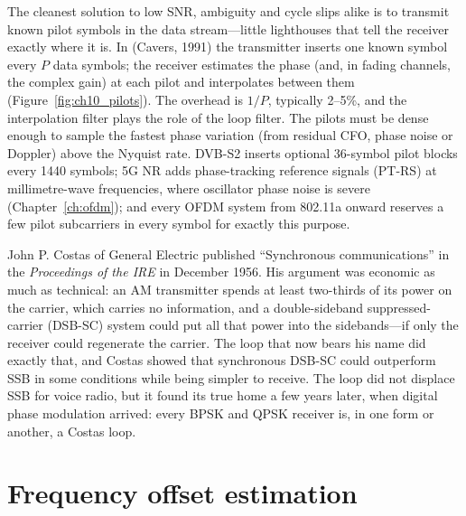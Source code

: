 The cleanest solution to low SNR, ambiguity and cycle slips alike is to transmit known pilot
symbols in the data stream---little lighthouses that tell the receiver exactly where it is. In
 (Cavers, 1991) the transmitter inserts one known symbol
every $P$ data symbols; the receiver estimates the phase (and, in fading channels, the complex
gain) at each pilot and interpolates between them (Figure~\ref{fig:ch10_pilots}). The overhead is
$1/P$, typically 2--5\%, and the interpolation filter plays the role of the loop filter. The pilots
must be dense enough to sample the fastest phase variation (from residual CFO, phase noise or
Doppler) above the Nyquist rate. DVB-S2 inserts optional 36-symbol pilot blocks every 1440 symbols;
5G NR adds phase-tracking reference signals (PT-RS) at millimetre-wave frequencies, where oscillator
phase noise is severe (Chapter~\ref{ch:ofdm}); and every OFDM system from 802.11a onward reserves a
few pilot subcarriers in every symbol for exactly this purpose.


\begin{history}
John P. Costas of General Electric published ``Synchronous communications'' in the
\emph{Proceedings of the IRE} in December 1956. His argument was economic as much as technical: an
AM transmitter spends at least two-thirds of its power on the carrier, which carries no information,
and a double-sideband suppressed-carrier (DSB-SC) system could put all that power into the
sidebands---if only the receiver could regenerate the carrier. The loop that now bears his name did
exactly that, and Costas showed that synchronous DSB-SC could outperform SSB in some conditions
while being simpler to receive. The loop did not displace SSB for voice radio, but it found its true
home a few years later, when digital phase modulation arrived: every BPSK and QPSK receiver is, in
one form or another, a Costas loop.
\end{history}

\section{Frequency offset estimation}
\label{sec:ch10:freq}

